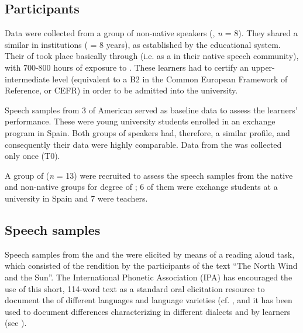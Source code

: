 \documentclass[output=paper]{langsci/langscibook}
\begin{document}
\subsection{Participants}
Data were collected from a group of non-native speakers (, \textit{n} = 8). They shared a similar  in  institutions ( = 8 years), as established by the  educational system. Their  of  took place basically through  (i.e. as a  in their native speech community), with 700-800 hours of exposure to . These learners had to certify an upper-intermediate   level (equivalent to a B2 in the Common European Framework of Reference, or CEFR) in order to be admitted into the  university.

Speech samples from 3  of American  served as baseline data to assess the learners’ performance. These  were young university students enrolled in an   exchange program in Spain. Both groups of speakers had, therefore, a similar profile, and consequently their data were highly comparable. Data from the  was collected only once (T0).

A group of   (\textit{n} = 13) were recruited to assess the speech samples from the native and non-native groups for degree of ; 6 of them were exchange students at a university in Spain and 7 were  teachers.

 
\subsection{Speech samples}


Speech samples from the  and the  were elicited by means of a reading aloud task, which consisted of the rendition by the participants of the text “The North Wind and the Sun”. The International Phonetic Association (IPA) has encouraged the use of this short, 114-word text as a standard oral elicitation resource to document the  of different languages and language varieties (cf. \cite{IPA1999}, and it has been used to document differences characterizing   in different dialects and by  learners (see \citeauthor{SchneiderEtAl2004}). 
\end{document}
